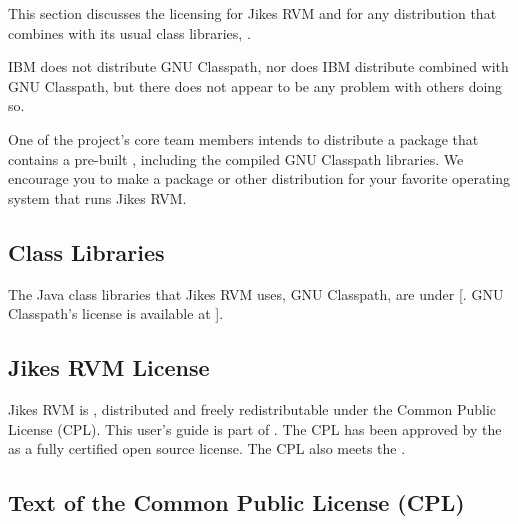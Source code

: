 %
This section discusses the licensing for Jikes\TMweb{} RVM and for
any distribution that combines \jrvm{} with its usual class
libraries,
.

IBM does not distribute GNU Classpath, nor does IBM distribute
\jrvm{} combined with GNU Classpath, but there does not appear to be
any problem with others doing so.

One of the project's core team members intends
to distribute a  package that
contains a pre-built \jrvm{}, including the compiled GNU Classpath
libraries.  We encourage you to make a package or other distribution
for your favorite operating system that runs Jikes RVM.

\subsection{Class Libraries}

%
%
%
The Java class libraries that Jikes RVM uses, GNU Classpath, 
are under [.  GNU Classpath's
license is available at {\tt \classpathLicenseURL}]{\classpathLicenseURL}.  

%
%
%
%
%
\subsection{Jikes RVM License}

Jikes\TMweb{} RVM is ,
distributed and freely redistributable under the Common Public License (CPL).  
This user's guide is part of \jrvm{}.
The CPL has been approved by the 
as a fully certified open source license.  The CPL also meets the
.



\subsection{Text of the Common Public License (CPL)}
%
%


%

